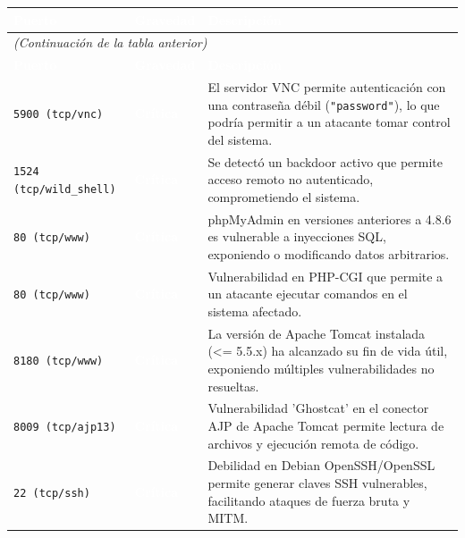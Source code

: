 \documentclass[11pt,oneside,a4paper]{book}
\begin{document}
\renewcommand{\arraystretch}{1.3}
\begin{longtable}{|p{3.5cm}|p{2cm}|p{8cm}|}
\hline
\rowcolor{heading-grey}
\textbf{\textcolor{white}{Puerto}} & \textbf{\textcolor{white}{Gravedad}} & \textbf{\textcolor{white}{Descripción}} \\ \hline
\endfirsthead

\multicolumn{3}{l}{\textit{\textcolor{heading-grey}{(Continuación de la tabla anterior)}}} \\
\hline
\rowcolor{heading-grey}
\textbf{\textcolor{white}{Puerto}} & \textbf{\textcolor{white}{Gravedad}} & \textbf{\textcolor{white}{Descripción}} \\ \hline
\endhead

\texttt{5900 (tcp/vnc)} & \cellcolor{Critical}\textbf{\textcolor{white}{Crítica}} & El servidor VNC permite autenticación con una contraseña débil (\texttt{"password"}), lo que podría permitir a un atacante tomar control del sistema. \\ \hline

\texttt{1524 (tcp/wild\_shell)} & \cellcolor{Critical}\textbf{\textcolor{white}{Crítica}} & Se detectó un backdoor activo que permite acceso remoto no autenticado, comprometiendo el sistema. \\ \hline

\texttt{80 (tcp/www)} & \cellcolor{Critical}\textbf{\textcolor{white}{Crítica}} & phpMyAdmin en versiones anteriores a 4.8.6 es vulnerable a inyecciones SQL, exponiendo o modificando datos arbitrarios. \\ \hline

\texttt{80 (tcp/www)} & \cellcolor{Critical}\textbf{\textcolor{white}{Crítica}} & Vulnerabilidad en PHP-CGI que permite a un atacante ejecutar comandos en el sistema afectado. \\ \hline

\texttt{8180 (tcp/www)} & \cellcolor{Critical}\textbf{\textcolor{white}{Crítica}} & La versión de Apache Tomcat instalada (\textless= 5.5.x) ha alcanzado su fin de vida útil, exponiendo múltiples vulnerabilidades no resueltas. \\ \hline

\texttt{8009 (tcp/ajp13)} & \cellcolor{Critical}\textbf{\textcolor{white}{Crítica}} & Vulnerabilidad 'Ghostcat' en el conector AJP de Apache Tomcat permite lectura de archivos y ejecución remota de código. \\ \hline

\texttt{22 (tcp/ssh)} & \cellcolor{Critical}\textbf{\textcolor{white}{Crítica}} & Debilidad en Debian OpenSSH/OpenSSL permite generar claves SSH vulnerables, facilitando ataques de fuerza bruta y MITM. \\ \hline


\end{longtable}
\end{document}
